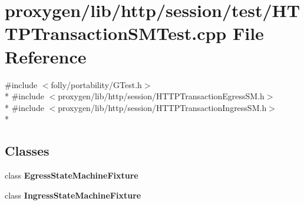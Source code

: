 \section{proxygen/lib/http/session/test/\+H\+T\+T\+P\+Transaction\+S\+M\+Test.cpp File Reference}
\label{HTTPTransactionSMTest_8cpp}
{\ttfamily \#include $<$folly/portability/\+G\+Test.\+h$>$}\\*
{\ttfamily \#include $<$proxygen/lib/http/session/\+H\+T\+T\+P\+Transaction\+Egress\+S\+M.\+h$>$}\\*
{\ttfamily \#include $<$proxygen/lib/http/session/\+H\+T\+T\+P\+Transaction\+Ingress\+S\+M.\+h$>$}\\*
\subsection*{Classes}
\begin{DoxyCompactItemize}
\item 
class {\bf Egress\+State\+Machine\+Fixture}
\item 
class {\bf Ingress\+State\+Machine\+Fixture}
\end{DoxyCompactItemize}
